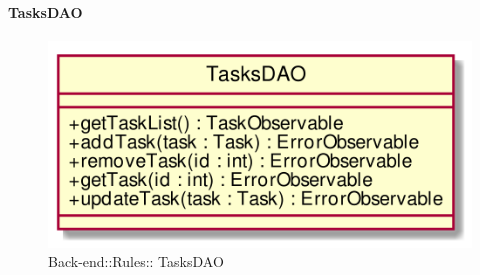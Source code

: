 \hypertarget{ TasksDAO_label}{\paragraph{ TasksDAO}}
\begin{figure}[h]
	\centering
	\includegraphics[width=\textwidth,height=\textheight,keepaspectratio]{images/Class_TasksDAO.png}
	\caption{Back-end::Rules:: TasksDAO}
\end{figure}
